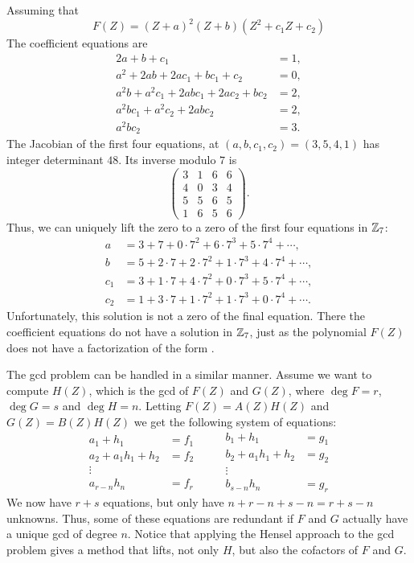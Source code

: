 Assuming that
\begin{equation} \label{Hensel:NSQEx:Eq}
F(Z) =  (Z + a)^2  (Z+b) (Z^2+c_1Z+c_2)
\end{equation}
The coefficient equations are 
\[
\begin{aligned}
2a + b + c_1 & = 1, \\
a^2 + 2ab + 2 ac_1 + b c_1 + c_2 & = 0, \\
a^2 b + a^2 c_1 + 2 a b c_1 + 2 a c_2 + b c_2 & = 2, \\
a^2 b c_1 + a^2 c_2 + 2 a b c_2 & = 2, \\
a^2 b c_2 & = 3.
\end{aligned}
\]
The Jacobian of the first four equations, at $(a,b,c_1,c_2) =
(3,5,4,1)$ has integer determinant $48$.  Its inverse modulo $7$ is
\[
\left(
\begin{array}{cccc}
3 & 1 & 6 & 6 \\
4 & 0 & 3 & 4 \\
5 & 5 & 6 & 5 \\
1 & 6 & 5 & 6 
\end{array}
\right).
\]
Thus, we can uniquely lift the zero to a zero of the first four
equations in $\mathbb{Z}_7$:
\[
\begin{aligned}
a   & = 3 +         7 + 0 \cdot 7^2 + 6 \cdot 7^3 + 5 \cdot 7^4 + \cdots, \\
b   & = 5 + 2 \cdot 7 + 2 \cdot 7^2 + 1 \cdot 7^3 + 4 \cdot 7^4 + \cdots, \\
c_1 & = 3 + 1 \cdot 7 + 4 \cdot 7^2 + 0 \cdot 7^3 + 5 \cdot 7^4 + \cdots, \\
c_2 & = 1 + 3 \cdot 7 + 1 \cdot 7^2 + 1 \cdot 7^3 + 0 \cdot 7^4 +
\cdots.
\end{aligned}
\]
Unfortunately, this solution is not a zero of the final equation.
There the coefficient equations do not have a solution in $\mathbb{Z}_7$, just
as the polynomial $F(Z)$ does not have a factorization of the form
.

\medskip
The {\sc gcd} problem can be handled in a similar manner.  Assume
we want to compute $H(Z)$, which is the {\sc gcd} of $F(Z)$ and $G(Z)$,
where $\deg F = r$, $\deg G = s$ and $\deg H = n$.  Letting $F(Z) =
A(Z) H(Z)$ and $G(Z) = B(Z) H(Z)$ we get the following system of
equations:
\[
\begin{aligned}
  a_1 + h_1 &= f_1\\
  a_2 + a_1 h_1 + h_2 &= f_2 \\
  \vdots\\
  a_{r - n} h_n & = f_r
\end{aligned} \qquad
\begin{aligned}
  b_1 + h_1 &= g_1\\
  b_2 + a_1 h_1 + h_2 &= g_2 \\
  \vdots\\
  b_{s - n} h_n & = g_r
\end{aligned}
\]
We now have $r+s$ equations, but only have $n + r -n + s - n = r + s
-n$ unknowns.  Thus, some of these equations are redundant if $F$
and $G$ actually have a unique {\sc gcd} of degree $n$.  Notice that
applying the Hensel approach to the {\sc gcd} problem gives a method
that lifts, not only $H$, but also the cofactors of $F$ and 
$G$. 

